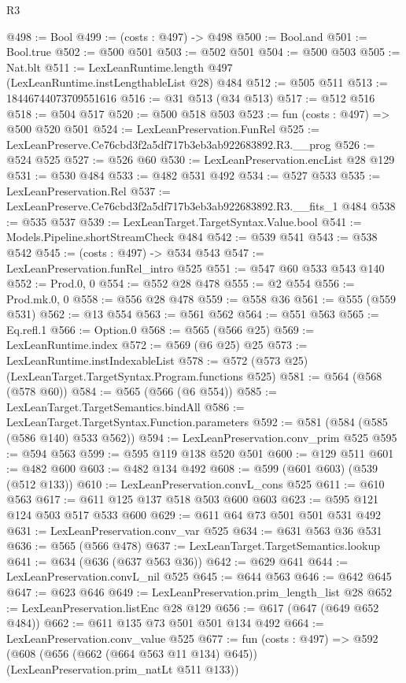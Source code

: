 \begin{lexlean}{R3}
\begin{coremodule}
@498 := Bool
@499 := (costs : @497) -> @498
@500 := Bool.and
@501 := Bool.true
@502 := @500 @501
@503 := @502 @501
@504 := @500 @503
@505 := Nat.blt
@511 := LexLeanRuntime.length @497 (LexLeanRuntime.instLengthableList @28) @484
@512 := @505 @511
@513 := 18446744073709551616
@516 := @31 @513 (@34 @513)
@517 := @512 @516
@518 := @504 @517
@520 := @500 @518 @503
@523 := fun (costs : @497) => @500 @520 @501
@524 := LexLeanPreservation.FunRel
@525 := LexLeanPreserve.Ce76cbd3f2a5df717b3eb3ab922683892.R3.__prog
@526 := @524 @525
@527 := @526 @60
@530 := LexLeanPreservation.encList @28 @129
@531 := @530 @484
@533 := @482 @531 @492
@534 := @527 @533
@535 := LexLeanPreservation.Rel
@537 := LexLeanPreserve.Ce76cbd3f2a5df717b3eb3ab922683892.R3.__fits_1 @484
@538 := @535 @537
@539 := LexLeanTarget.TargetSyntax.Value.bool
@541 := Models.Pipeline.shortStreamCheck @484
@542 := @539 @541
@543 := @538 @542
@545 := (costs : @497) -> @534 @543
@547 := LexLeanPreservation.funRel_intro @525
@551 := @547 @60 @533 @543 @140
@552 := Prod.{0, 0}
@554 := @552 @28 @478
@555 := @2 @554
@556 := Prod.mk.{0, 0}
@558 := @556 @28 @478
@559 := @558 @36
@561 := @555 (@559 @531)
@562 := @13 @554
@563 := @561 @562
@564 := @551 @563
@565 := Eq.refl.{1}
@566 := Option.{0}
@568 := @565 (@566 @25)
@569 := LexLeanRuntime.index
@572 := @569 (@6 @25) @25
@573 := LexLeanRuntime.instIndexableList
@578 := @572 (@573 @25) (LexLeanTarget.TargetSyntax.Program.functions @525)
@581 := @564 (@568 (@578 @60))
@584 := @565 (@566 (@6 @554))
@585 := LexLeanTarget.TargetSemantics.bindAll
@586 := LexLeanTarget.TargetSyntax.Function.parameters
@592 := @581 (@584 (@585 (@586 @140) @533 @562))
@594 := LexLeanPreservation.conv_prim @525
@595 := @594 @563
@599 := @595 @119 @138 @520 @501
@600 := @129 @511
@601 := @482 @600
@603 := @482 @134 @492
@608 := @599 (@601 @603) (@539 (@512 @133))
@610 := LexLeanPreservation.convL_cons @525
@611 := @610 @563
@617 := @611 @125 @137 @518 @503 @600 @603
@623 := @595 @121 @124 @503 @517 @533 @600
@629 := @611 @64 @73 @501 @501 @531 @492
@631 := LexLeanPreservation.conv_var @525
@634 := @631 @563 @36 @531
@636 := @565 (@566 @478)
@637 := LexLeanTarget.TargetSemantics.lookup
@641 := @634 (@636 (@637 @563 @36))
@642 := @629 @641
@644 := LexLeanPreservation.convL_nil @525
@645 := @644 @563
@646 := @642 @645
@647 := @623 @646
@649 := LexLeanPreservation.prim_length_list @28
@652 := LexLeanPreservation.listEnc @28 @129
@656 := @617 (@647 (@649 @652 @484))
@662 := @611 @135 @73 @501 @501 @134 @492
@664 := LexLeanPreservation.conv_value @525
@677 := fun (costs : @497) =>
  @592 (@608 (@656 (@662 (@664 @563 @11 @134) @645)) (LexLeanPreservation.prim_natLt @511 @133))

\end{coremodule}
\end{lexlean}
